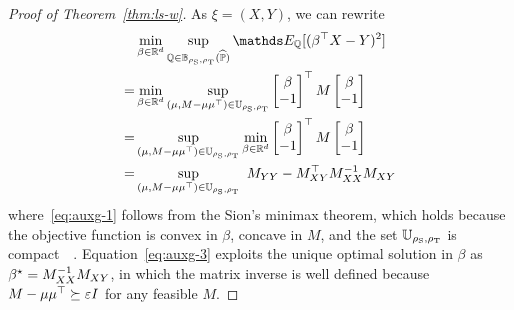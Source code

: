 \documentclass{article}
\begin{document}
\begin{proof}[Proof of Theorem~\ref{thm:ls-w}]
    As $\xi = (X, Y)$, we can rewrite
    \begin{subequations}
    \begin{align}
    &\Min{\beta \in \R^d} \Sup{\QQ \in \mbb B_{\rho_{\rm S}, \rho_{\rm T}}(\Pnom)} \EE_\QQ[(\beta^\top X - Y)^2] \\
        = & \Min{\beta \in \R^d} \Sup{(\m, M - \mu \mu^\top) \in \mbb U_{\rho_{\rm S}, \rho_{\rm T}}} \begin{bmatrix} \beta \\ -1 \end{bmatrix}^\top M \begin{bmatrix} \beta \\ -1 \end{bmatrix} \notag\\
        = & \Sup{(\m, M - \m\m^\top) \in \mbb U_{\rho_{\rm S}, \rho_{\rm T}}}\Min{\beta \in \R^d}  \begin{bmatrix} \beta \\ -1 \end{bmatrix}^\top M \begin{bmatrix} \beta \\ -1 \end{bmatrix} \label{eq:auxg-1}\\
        = & \Sup{(\m, M - \m\m^\top) \in \mbb U_{\rho_{\rm S}, \rho_{\rm T}}}~M_{YY} - M_{XY}^\top M_{XX}^{-1} M_{XY} 
        \label{eq:auxg-3}
\end{align}
\end{subequations}
where~\eqref{eq:auxg-1} follows from the Sion's minimax theorem, which holds because the objective function is convex in $\beta$, concave in $M$, and the set $\mathbb U_{\rho_{\rm S}, \rho_{\rm T}}$ is compact~~\citep[Lemma~A.6]{ref:abadeh2018wasserstein}. Equation~\eqref{eq:auxg-3} exploits the unique optimal solution in $\beta$ as $\beta^\star = M_{XX}^{-1} M_{XY}$, in which the matrix inverse is well defined because $M - \mu\mu^\top \succeq \varepsilon I$ for any feasible $M$.
\end{proof}
\end{document}
